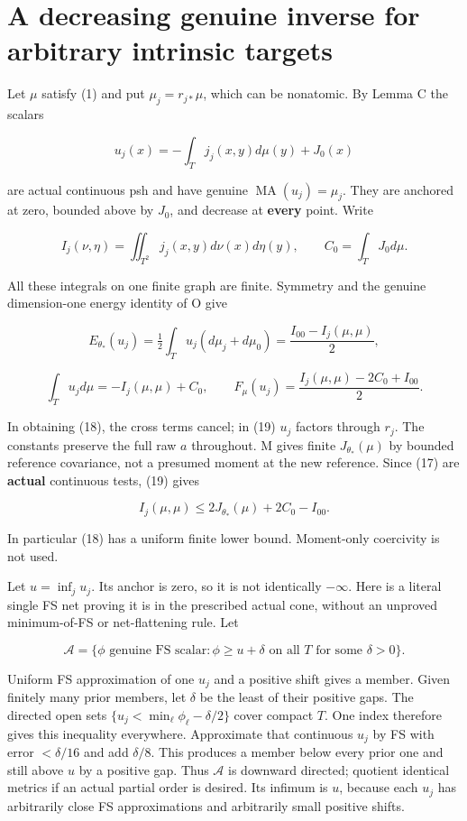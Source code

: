 \documentclass[
  11pt,
]{article}
\begin{document}
\section{A decreasing genuine inverse for arbitrary intrinsic
targets}\label{a-decreasing-genuine-inverse-for-arbitrary-intrinsic-targets}

Let \(\mu\) satisfy (1) and put \(\mu_j=r_{j*}\mu\), which can be
nonatomic. By Lemma C the scalars

\[
 u_j(x)=-\int_Tj_j(x,y)d\mu(y)+J_0(x)                              \tag{17}
\]

are actual continuous psh and have genuine
\(\operatorname{MA}(u_j)=\mu_j\). They are anchored at zero, bounded
above by \(J_0\), and decrease at \textbf{every} point. Write

\[
 I_j(\nu,\eta)=\iint_{T^2}j_j(x,y)d\nu(x)d\eta(y),\qquad
 C_0=\int_TJ_0d\mu.
\]

All these integrals on one finite graph are finite. Symmetry and the
genuine dimension-one energy identity of O give

\[
 E_{\theta_*}(u_j)=\tfrac12\int_Tu_j(d\mu_j+d\mu_0)
                  =\frac{I_{00}-I_j(\mu,\mu)}2,                  \tag{18}
\]

\[
 \int_Tu_jd\mu=-I_j(\mu,\mu)+C_0,\qquad
 F_\mu(u_j)=\frac{I_j(\mu,\mu)-2C_0+I_{00}}2.                     \tag{19}
\]

In obtaining (18), the cross terms cancel; in (19) \(u_j\) factors
through \(r_j\). The constants preserve the full raw \(a\) throughout. M
gives finite \(J_{\theta_*}(\mu)\) by bounded reference covariance, not
a presumed moment at the new reference. Since (17) are \textbf{actual}
continuous tests, (19) gives

\[
 I_j(\mu,\mu)\leq2J_{\theta_*}(\mu)+2C_0-I_{00}.                 \tag{20}
\]

In particular (18) has a uniform finite lower bound. Moment-only
coercivity is not used.

Let \(u=\inf_j u_j\). Its anchor is zero, so it is not identically
\(-\infty\). Here is a literal single FS net proving it is in the
prescribed actual cone, without an unproved minimum-of-FS or
net-flattening rule. Let

\[
 \mathcal A=\{\phi\text{ genuine FS scalar}:
       \phi\geq u+\delta\text{ on all }T\text{ for some }\delta>0\}.
\]

Uniform FS approximation of one \(u_j\) and a positive shift gives a
member. Given finitely many prior members, let \(\delta\) be the least
of their positive gaps. The directed open sets
\(\{u_j<\min_\ell\phi_\ell-\delta/2\}\) cover compact \(T\). One index
therefore gives this inequality everywhere. Approximate that continuous
\(u_j\) by FS with error \(<\delta/16\) and add \(\delta/8\). This
produces a member below every prior one and still above \(u\) by a
positive gap. Thus \(\mathcal A\) is downward directed; quotient
identical metrics if an actual partial order is desired. Its infimum is
\(u\), because each \(u_j\) has arbitrarily close FS approximations and
arbitrarily small positive shifts.
\end{document}
